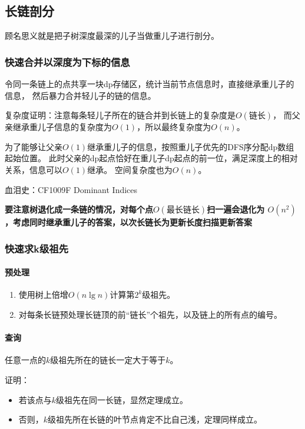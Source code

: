 \subsection{长链剖分}

顾名思义就是把子树深度最深的儿子当做重儿子进行剖分。

\subsubsection{快速合并以深度为下标的信息}
令同一条链上的点共享一块dp存储区，统计当前节点信息时，直接继承重儿子的信息，
然后暴力合并轻儿子的链的信息。

复杂度证明：注意每条轻儿子所在的链合并到长链上的复杂度是$O(\textrm{链长})$，
而父亲继承重儿子信息的复杂度为$O(1)$，所以最终复杂度为$O(n)$。

为了能够让父亲$O(1)$继承重儿子的信息，按照重儿子优先的DFS序分配dp数组起始位置。
此时父亲的dp起点恰好在重儿子dp起点的前一位，满足深度上的相对关系，信息可以$O(1)$继承。
空间复杂度也为$O(n)$。

血泪史：CF1009F Dominant Indices

	{\bfseries 要注意树退化成一条链的情况，对每个点$O(\textrm{最长链长})$扫一遍会退化为
		$O(n^2)$，考虑同时继承重儿子的答案，以次长链长为更新长度扫描更新答案}



\subsubsection{快速求k级祖先}
\paragraph{预处理}
\begin{enumerate}
	\item 使用树上倍增$O(n\lg n)$计算第$2^k$级祖先。
	\item 对每条长链预处理长链顶的前``链长''个祖先，以及链上的所有点的编号。
\end{enumerate}

\paragraph{查询}

\begin{theorem}\label{DBCBD}
	任意一点的$k$级祖先所在的链长一定大于等于$k$。
\end{theorem}
证明：
\begin{itemize}
	\item 若该点与$k$级祖先在同一长链，显然定理成立。
	\item 否则，$k$级祖先所在长链的叶节点肯定不比自己浅，定理同样成立。
\end{itemize}

